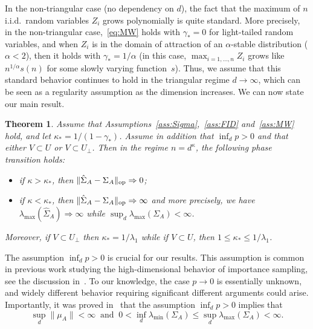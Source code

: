\documentclass[]{article}
\newcommand{\op}{{\rm op}}
\theoremstyle{plain}
\newtheorem{thm}[lemma]{Theorem}
\theoremstyle{definition}
\begin{document}
In the non-triangular case (no dependency on $d$), the fact that the maximum of $n$ i.i.d.\ random variables $Z_i$ grows polynomially is quite standard. More precisely, in the non-triangular case,~\eqref{eq:MW} holds with $\gamma_* = 0$ for light-tailed random variables, and when $Z_i$ is in the domain of attraction of an $\alpha$-stable distribution ($\alpha < 2$), then it holds with $\gamma_* = 1/\alpha$ (in this case, $\max_{i=1, \dots, n} Z_i$ grows like $n^{1/\alpha} s(n)$ for some slowly varying function~$s$). Thus, we assume that this standard behavior continues to hold in the triangular regime $d \to \infty$, which can be seen as a regularity assumption as the dimension increases. We can now state our main result.

\begin{thm} \label{thm:main}
	Assume that Assumptions~\ref{ass:Sigma},~\ref{ass:FID} and~\ref{ass:MW} hold, and let $\kappa_* = 1/(1-\gamma_*)$. Assume in addition that $\inf_d p > 0$ and that either $V \subset U$ or $V \subset U_\perp$. Then in the regime $n = d^\kappa$, the following phase transition holds:
	\begin{itemize}
		\item if $\kappa > \kappa_*$, then $\lVert \hat \Sigma_A - \Sigma_A \rVert_\op \Rightarrow 0$;
		\item if $\kappa < \kappa_*$, then $\lVert \hat \Sigma_A - \Sigma_A \rVert_\op \Rightarrow \infty$ and more precisely, we have $\lambda_{\max}(\hat \Sigma_A) \Rightarrow \infty$ while $\sup_d \lambda_{\max}(\Sigma_A) < \infty$.
	\end{itemize}
	Moreover, if $V \subset U_\perp$ then $\kappa_* = 1/\lambda_1$ while if $V \subset U$, then $1 \leq \kappa_* \leq 1/\lambda_1$.
\end{thm}

The assumption $\inf_d p > 0$ is crucial for our results. This assumption is common in previous work studying the high-dimensional behavior of importance sampling, see the discussion in~\cite[Section $2.4$]{beh2023insight}. To our knowledge, the case $p \to 0$ is essentially unknown, and widely different behavior requiring significant different arguments could arise. Importantly, it was proved in~\cite[Corollary $4.2$]{beh2023insight} that the assumption $\inf_d p > 0$ implies that
\begin{equation} \label{eq:inf-p}
	\sup_d \lVert \mu_A \rVert < \infty \ \text{ and } \ 0 < \inf_d \lambda_{\min}(\Sigma_A) \leq \sup_d \lambda_{\max}(\Sigma_A) < \infty.
\end{equation}
\end{document}
